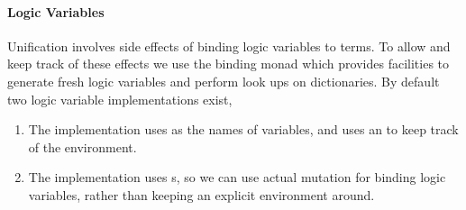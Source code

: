 \documentclass[thesis-solanki.tex]{subfiles}
\begin{document}
\paragraph{Logic Variables}
Unification involves side effects of binding logic variables to terms. To allow and keep track of these effects we use the binding monad
which provides facilities to generate fresh logic variables and perform look ups on dictionaries. By default two logic variable
implementations exist,

\begin{enumerate}
\item The  implementation uses  as the names of variables, and uses an
   to keep track of the environment. 

\item The  implementation uses s, so we can use actual mutation for binding logic
  variables, rather than keeping an explicit environment around.

\end{enumerate}

\end{document}
